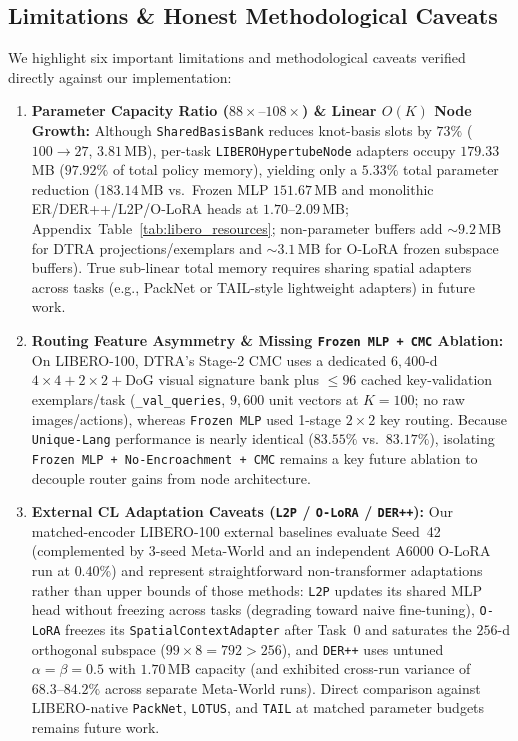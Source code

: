 \documentclass[10pt]{article}
\begin{document}
\subsection{Limitations \& Honest Methodological Caveats}
We highlight six important limitations and methodological caveats verified directly against our implementation:
\begin{enumerate}[leftmargin=*,itemsep=1.5pt,topsep=2pt]
  \item \textbf{Parameter Capacity Ratio ($88{\times}\text{--}108{\times}$) \& Linear $O(K)$ Node Growth:} Although \texttt{SharedBasisBank} reduces knot-basis slots by $73\%$ ($100 \to 27$, $3.81\,$MB), per-task \texttt{LIBEROHypertubeNode} adapters occupy $179.33\,$MB ($97.92\%$ of total policy memory), yielding only a $5.33\%$ total parameter reduction ($183.14\,$MB vs.\ Frozen MLP $151.67\,$MB and monolithic ER/DER++/L2P/O-LoRA heads at $1.70\text{--}2.09\,$MB; Appendix~Table~\ref{tab:libero_resources}; non-parameter buffers add $\sim 9.2\,$MB for DTRA projections/exemplars and $\sim 3.1\,$MB for O-LoRA frozen subspace buffers). True sub-linear total memory requires sharing spatial adapters across tasks (e.g., PackNet or TAIL-style lightweight adapters) in future work.
  \item \textbf{Routing Feature Asymmetry \& Missing \texttt{Frozen MLP + CMC} Ablation:} On LIBERO-100, DTRA's Stage-2 CMC uses a dedicated $6{,}400$-d $4\times 4+2\times 2+\text{DoG}$ visual signature bank plus $\le 96$ cached key-validation exemplars/task (\texttt{\_val\_queries}, $9{,}600$ unit vectors at $K=100$; no raw images/actions), whereas \texttt{Frozen MLP} used 1-stage $2\times 2$ key routing. Because \texttt{Unique-Lang} performance is nearly identical ($83.55\%$ vs.\ $83.17\%$), isolating \texttt{Frozen MLP + No-Encroachment + CMC} remains a key future ablation to decouple router gains from node architecture.
  \item \textbf{External CL Adaptation Caveats (\texttt{L2P} / \texttt{O-LoRA} / \texttt{DER++}):} Our matched-encoder LIBERO-100 external baselines evaluate Seed~42 (complemented by 3-seed Meta-World and an independent A6000 O-LoRA run at $0.40\%$) and represent straightforward non-transformer adaptations rather than upper bounds of those methods: \texttt{L2P} updates its shared MLP head without freezing across tasks (degrading toward naive fine-tuning), \texttt{O-LoRA} freezes its \texttt{SpatialContextAdapter} after Task~0 and saturates the $256$-d orthogonal subspace ($99 \times 8 = 792 > 256$), and \texttt{DER++} uses untuned $\alpha=\beta=0.5$ with $1.70\,$MB capacity (and exhibited cross-run variance of $68.3\text{--}84.2\%$ across separate Meta-World runs). Direct comparison against LIBERO-native \texttt{PackNet}, \texttt{LOTUS}, and \texttt{TAIL} at matched parameter budgets remains future work.

\end{enumerate}
\end{document}

